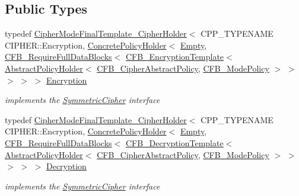 \subsection*{Public Types}
\begin{DoxyCompactItemize}
\item 
\hypertarget{struct_c_f_b___f_i_p_s___mode_ab97bf56ee769ebdf088cad35e351deae}{
typedef \hyperlink{class_cipher_mode_final_template___cipher_holder}{CipherModeFinalTemplate\_\-CipherHolder}$<$ CPP\_\-TYPENAME CIPHER::Encryption, \hyperlink{class_concrete_policy_holder}{ConcretePolicyHolder}$<$ \hyperlink{class_empty}{Empty}, \hyperlink{class_c_f_b___require_full_data_blocks}{CFB\_\-RequireFullDataBlocks}$<$ \hyperlink{class_c_f_b___encryption_template}{CFB\_\-EncryptionTemplate}$<$ \hyperlink{class_abstract_policy_holder}{AbstractPolicyHolder}$<$ \hyperlink{class_c_f_b___cipher_abstract_policy}{CFB\_\-CipherAbstractPolicy}, \hyperlink{class_c_f_b___mode_policy}{CFB\_\-ModePolicy} $>$ $>$ $>$ $>$ $>$ \hyperlink{struct_c_f_b___f_i_p_s___mode_ab97bf56ee769ebdf088cad35e351deae}{Encryption}}
\label{struct_c_f_b___f_i_p_s___mode_ab97bf56ee769ebdf088cad35e351deae}

\begin{DoxyCompactList}\small\item\em implements the \hyperlink{class_symmetric_cipher}{SymmetricCipher} interface \item\end{DoxyCompactList}\item 
\hypertarget{struct_c_f_b___f_i_p_s___mode_a513fdf49fc5d09f946549949fdb0e747}{
typedef \hyperlink{class_cipher_mode_final_template___cipher_holder}{CipherModeFinalTemplate\_\-CipherHolder}$<$ CPP\_\-TYPENAME CIPHER::Encryption, \hyperlink{class_concrete_policy_holder}{ConcretePolicyHolder}$<$ \hyperlink{class_empty}{Empty}, \hyperlink{class_c_f_b___require_full_data_blocks}{CFB\_\-RequireFullDataBlocks}$<$ \hyperlink{class_c_f_b___decryption_template}{CFB\_\-DecryptionTemplate}$<$ \hyperlink{class_abstract_policy_holder}{AbstractPolicyHolder}$<$ \hyperlink{class_c_f_b___cipher_abstract_policy}{CFB\_\-CipherAbstractPolicy}, \hyperlink{class_c_f_b___mode_policy}{CFB\_\-ModePolicy} $>$ $>$ $>$ $>$ $>$ \hyperlink{struct_c_f_b___f_i_p_s___mode_a513fdf49fc5d09f946549949fdb0e747}{Decryption}}
\label{struct_c_f_b___f_i_p_s___mode_a513fdf49fc5d09f946549949fdb0e747}

\begin{DoxyCompactList}\small\item\em implements the \hyperlink{class_symmetric_cipher}{SymmetricCipher} interface \item\end{DoxyCompactList}\end{DoxyCompactItemize}


